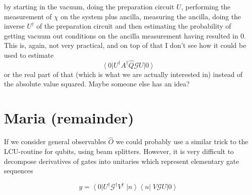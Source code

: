 \documentclass[aps,pra,10pt,twocolumn,groupedaddress,nofootinbib]{revtex4-1}
\theoremstyle{plain}
\newcommand{\ket}[1]{\ensuremath{\left| #1 \right \rangle}}
\newcommand{\bra}[1]{\ensuremath{\left \langle #1 \right |}}
\newcommand{\ketbra}[2]{\ket{#1}\bra{#2}}
\newcommand{\G}{\mathcal{G}}
\begin{document}
\begin{description}
  by starting in the vacuum, doing the preparation circuit $U$, performing the measurement of $\chi$ on the system plus ancilla, measuring the ancilla, doing the inverse $U^\dagger$ of the preparation circuit and then estimating the probability of getting vacuum out conditions on the ancilla measurement having resulted in $0$.
  This is, again, not very practical, and on top of that I don't see how it could be used to estimate 
  \begin{equation}
    \bra{0} U^\dagger A^{\dagger}  \hat{Q} \G U \ket{0}
  \end{equation}
  or the real part of that (which is what we are actually interested in) instead of the absolute value squared.
  Maybe someone else has an idea?
\end{description}



\section{Maria (remainder)}

If we consider general observables $\hat{O}$ we could probably use a similar trick to the LCU-routine for qubits, using beam splitters. However, it is very difficult to decompose derivatives of gates into unitaries which represent elementary gate sequences 

\[ y = \bra{0}U^{\dagger} \G^{\dagger} V^{\dagger} \; \ketbra{n}{n} \; V \G U \ket{0} \]
\end{document}
